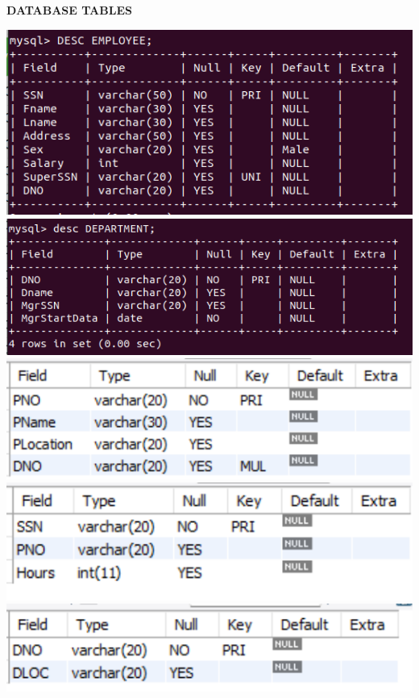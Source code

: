 \documentclass[a4paper,12pt]{report}
\begin{document}
	\begin{flushleft}
		\textbf{DATABASE TABLES}
	\end{flushleft} 
      \includegraphics[scale=0.6]{employee.png}
    \includegraphics[scale=0.6]{department.png}
    \includegraphics[scale=1.3]{PROJECT.png}
    \includegraphics[scale=1.3]{WORKS_ON.png}
	\includegraphics[scale=1.3]{DLOCATION.png}
	\newpage
	
\end{document}
